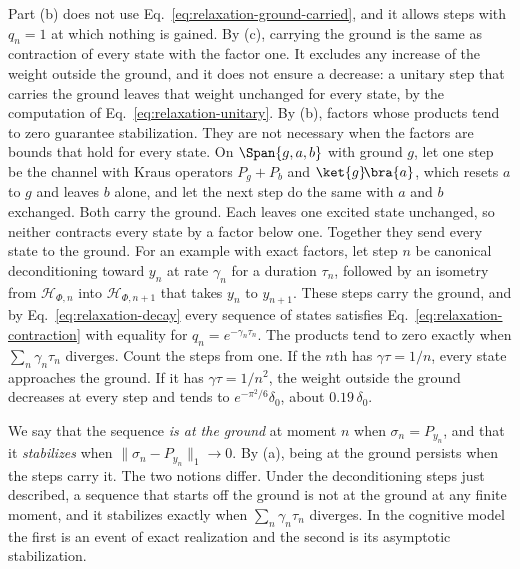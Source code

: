 Part (b) does not use Eq.~\eqref{eq:relaxation-ground-carried}, and it allows steps with $q_n=1$ at which nothing is gained. By (c), carrying the ground is the same as contraction of every state with the factor one. It excludes any increase of the weight outside the ground, and it does not ensure a decrease: a unitary step that carries the ground leaves that weight unchanged for every state, by the computation of Eq.~\eqref{eq:relaxation-unitary}. By (b), factors whose products tend to zero guarantee stabilization. They are not necessary when the factors are bounds that hold for every state. On $\Span\{g,a,b\}$ with ground $g$, let one step be the channel with Kraus operators $P_g+P_b$ and $\ket{g}\!\bra{a}$, which resets $a$ to $g$ and leaves $b$ alone, and let the next step do the same with $a$ and $b$ exchanged. Both carry the ground. Each leaves one excited state unchanged, so neither contracts every state by a factor below one. Together they send every state to the ground. For an example with exact factors, let step $n$ be canonical deconditioning toward $y_n$ at rate $\gamma_n$ for a duration $\tau_n$, followed by an isometry from $\mathcal H_{\Phi,n}$ into $\mathcal H_{\Phi,n+1}$ that takes $y_n$ to $y_{n+1}$. These steps carry the ground, and by Eq.~\eqref{eq:relaxation-decay} every sequence of states satisfies Eq.~\eqref{eq:relaxation-contraction} with equality for $q_n=e^{-\gamma_n\tau_n}$. The products tend to zero exactly when $\sum_n\gamma_n\tau_n$ diverges. Count the steps from one. If the $n$th has $\gamma\tau=1/n$, every state approaches the ground. If it has $\gamma\tau=1/n^2$, the weight outside the ground decreases at every step and tends to $e^{-\pi^2/6}\delta_0$, about $0.19\,\delta_0$.

We say that the sequence \emph{is at the ground} at moment $n$ when $\sigma_n=P_{y_n}$, and that it \emph{stabilizes} when $\|\sigma_n-P_{y_n}\|_1\to0$. By (a), being at the ground persists when the steps carry it. The two notions differ. Under the deconditioning steps just described, a sequence that starts off the ground is not at the ground at any finite moment, and it stabilizes exactly when $\sum_n\gamma_n\tau_n$ diverges. In the cognitive model the first is an event of exact realization and the second is its asymptotic stabilization.

